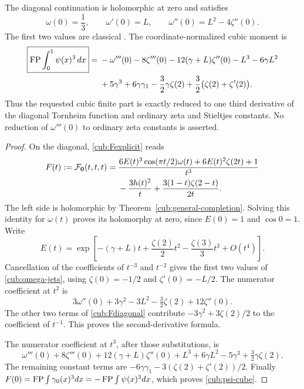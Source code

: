 \begin{theorem}
\label{cub:diagonal}
The diagonal continuation is holomorphic at zero and satisfies
\begin{equation}\label{cub:omega-jets}
 \omega(0)=\frac13,\qquad \omega'(0)=L,
 \qquad \boxed{\omega''(0)=L^2-4\zeta''(0)}.
\end{equation}
The first two values are classical \cite{BorweinDilcher}.
The coordinate-normalized cubic moment is
\begin{align}
 \boxed{\displaystyle\operatorname*{FP}\int_0^1\psi(x)^3\,dx}
 ={}&-\omega'''(0)-8\zeta'''(0)
       -12(\gamma+L)\zeta''(0)-L^3-6\gamma L^2
       \notag\\
 &+5\gamma^3+6\gamma\gamma_1
       -\frac32\gamma\zeta(2)
       +\frac32\bigl(\zeta(2)+\zeta'(2)\bigr).
 \label{cub:psi-cube}
\end{align}
Thus the requested cubic finite part is exactly reduced to one third
derivative of the diagonal Tornheim function and ordinary zeta and
Stieltjes constants.  No reduction of $\omega'''(0)$ to ordinary zeta
constants is asserted.
\end{theorem}

\begin{proof}
On the diagonal, \eqref{cub:Fexplicit} reads
\begin{align}
 F(t):=\mathcal F_{\boldsymbol0}(t,t,t)
 ={}&\frac{6E(t)^3\cos(\pi t/2)\omega(t)
              +6E(t)^2\zeta(2t)+1}{t^3}
       \notag\\
 &-\frac{3h(t)^2}{t}
       +\frac{3(1-t)\zeta(2-t)}{2t}.
 \label{cub:Fdiagonal}
\end{align}
The left side is holomorphic by
Theorem~\ref{cub:general-completion}.  Solving this identity for
$\omega(t)$ proves its holomorphy at zero, since $E(0)=1$ and
$\cos0=1$.  Write
\[
 E(t)=\exp\left[-(\gamma+L)t+
                 \frac{\zeta(2)}2t^2-\frac{\zeta(3)}3t^3+O(t^4)\right].
\]
Cancellation of the coefficients of $t^{-3}$ and $t^{-2}$ gives the
first two values of \eqref{cub:omega-jets}, using
$\zeta(0)=-1/2$ and $\zeta'(0)=-L/2$.
The numerator coefficient at $t^2$ is
\[
 3\omega''(0)+3\gamma^2-3L^2-\tfrac32\zeta(2)+12\zeta''(0).
\]
The other two terms of \eqref{cub:Fdiagonal} contribute
$-3\gamma^2+3\zeta(2)/2$ to the coefficient of $t^{-1}$.
This proves the second-derivative formula.

The numerator coefficient at $t^3$, after those substitutions, is
\[
 \omega'''(0)+8\zeta'''(0)+12(\gamma+L)\zeta''(0)
 +L^3+6\gamma L^2-5\gamma^3+\tfrac32\gamma\zeta(2).
\]
The remaining constant terms are
$-6\gamma\gamma_1-3(\zeta(2)+\zeta'(2))/2$.
Finally $F(0)=\operatorname*{FP}\int\gamma_0(x)^3dx=-\operatorname*{FP}\int\psi(x)^3dx$,
which proves \eqref{cub:psi-cube}.
\end{proof}


